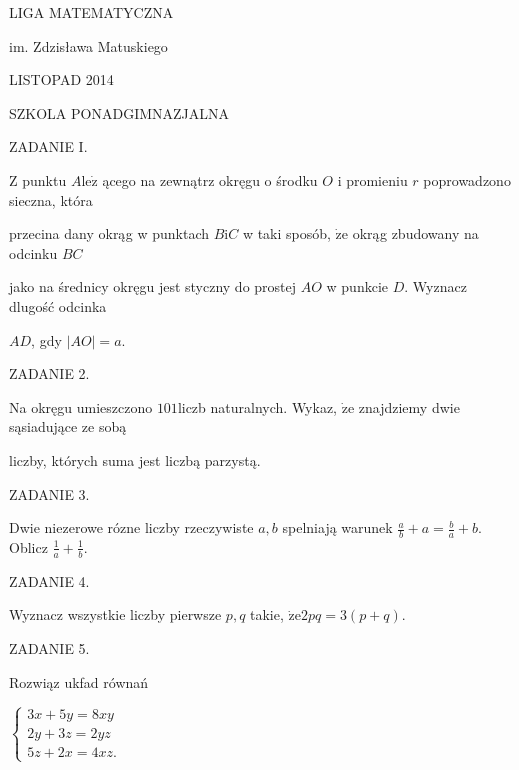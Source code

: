 \documentclass[a4paper,12pt]{article}
\begin{document}
LIGA MATEMATYCZNA

im. Zdzisława Matuskiego

LISTOPAD 2014

SZKOLA PONADGIMNAZJALNA

ZADANIE I.

$\mathrm{Z}$ punktu $A\mathrm{l}\mathrm{e}\dot{\mathrm{z}}$ ącego na zewnątrz okręgu o środku $O$ i promieniu $r$ poprowadzono sieczna, która

przecina dany okrąg w punktach $B\mathrm{i}C$ w taki sposób, $\dot{\mathrm{z}}\mathrm{e}$ okrąg zbudowany na odcinku $BC$

jako na średnicy okręgu jest styczny do prostej $AO$ w punkcie $D$. Wyznacz dlugość odcinka

$AD$, gdy $|AO|=a.$

ZADANIE 2.

Na okręgu umieszczono $101$liczb naturalnych. Wykaz, $\dot{\mathrm{z}}\mathrm{e}$ znajdziemy dwie sąsiadujące ze sobą

liczby, których suma jest liczbą parzystą.

ZADANIE 3.

Dwie niezerowe rózne liczby rzeczywiste $a, b$ spelniają warunek $\displaystyle \frac{a}{b}+a=\frac{b}{a}+b$. Oblicz $\displaystyle \frac{1}{a}+\frac{1}{b}.$

ZADANIE 4.

Wyznacz wszystkie liczby pierwsze $p, q$ takie, $\dot{\mathrm{z}}\mathrm{e}2pq=3(p+q).$

ZADANIE 5.

Rozwiąz ukfad równań

$\left\{\begin{array}{l}
3x+5y=8xy\\
2y+3z=2yz\\
5z+2x=4xz.
\end{array}\right.$
\end{document}

